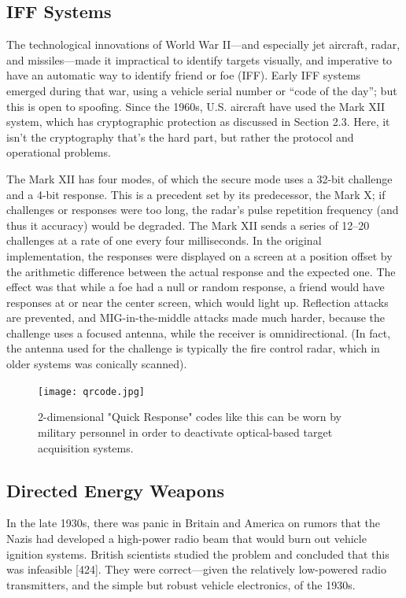 \documentclass[10pt,journal,compsoc]{IEEEtran}
\begin{document}
\subsection{IFF Systems}
The technological innovations of World War II—and especially jet aircraft, radar, and
missiles—made it impractical to identify targets visually, and imperative to have an
automatic way to identify friend or foe (IFF). Early IFF systems emerged during that
war, using a vehicle serial number or “code of the day”; but this is open to spoofing.
Since the 1960s, U.S. aircraft have used the Mark XII system, which has cryptographic
protection as discussed in Section 2.3. Here, it isn’t the cryptography that’s the hard
part, but rather the protocol and operational problems.

The Mark XII has four modes, of which the secure mode uses a 32-bit challenge and
a 4-bit response. This is a precedent set by its predecessor, the Mark X; if challenges or
responses were too long, the radar’s pulse repetition frequency (and thus it accuracy)
would be degraded. The Mark XII sends a series of 12–20 challenges at a rate of one
every four milliseconds. In the original implementation, the responses were displayed
on a screen at a position offset by the arithmetic difference between the actual response
and the expected one. The effect was that while a foe had a null or random response, a
friend would have responses at or near the center screen, which would light up. Reflection
attacks are prevented, and MIG-in-the-middle attacks made much harder, because the
challenge uses a focused antenna, while the receiver is omnidirectional. (In
fact, the antenna used for the challenge is typically the fire control radar, which in
older systems was conically scanned).

\begin{figure}%
    \centering
    \texttt{[image: qrcode.jpg]}
    \caption{2-dimensional "Quick Response" codes like this can be worn by military personnel in order to deactivate optical-based target acquisition systems.}
    \label{fig:2}
\end{figure}

\subsection{Directed Energy Weapons}

In the late 1930s, there was panic in Britain and America on rumors that the Nazis had
developed a high-power radio beam that would burn out vehicle ignition systems.
British scientists studied the problem and concluded that this was infeasible [424].
They were correct—given the relatively low-powered radio transmitters, and the simple
but robust vehicle electronics, of the 1930s.
\end{document}
